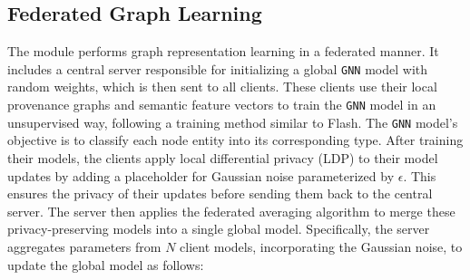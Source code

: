 \subsection{Federated Graph Learning}



The module performs graph representation learning in a federated manner. It includes a central server responsible for initializing a global \texttt{GNN} model with random weights, which is then sent to all clients. These clients use their local provenance graphs and semantic feature vectors to train the \texttt{GNN} model in an unsupervised way, following a training method similar to Flash. The \texttt{GNN} model's objective is to classify each node entity into its corresponding type. After training their models, the clients apply local differential privacy (LDP) to their model updates by adding a placeholder for Gaussian noise parameterized by \(\epsilon\). This ensures the privacy of their updates before sending them back to the central server. The server then applies the federated averaging algorithm to merge these privacy-preserving models into a single global model. Specifically, the server aggregates parameters from \(N\) client models, incorporating the Gaussian noise, to update the global model as follows:

